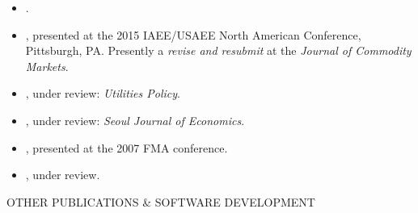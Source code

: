 \documentclass[9pt]{article}
\begin{document}
\begin{itemize}[noitemsep, nolistsep]
\item \href{https://papers.ssrn.com/sol3/papers.cfm?abstract_id=2848527}{\color{Blue}{High-Frequency Trading and Market Efficiency: Evidence from the Weekly Natural Gas Storage Report}}. 
\item \href{http://complete-markets.com/wp-content/uploads/2013/11/ng_vol.pdf}{\color{Blue}{The Components of Volatility in Natural Gas Futures}}, presented at the 2015 IAEE/USAEE North American Conference, Pittsburgh, PA.  Presently a {\it revise and resubmit} at the {\it Journal of Commodity Markets}.
\item \href{http://ssrn.com/abstract=2371753}{\color{Blue}{State Dependence in the Natural Gas and Rig Count Relationship}}, under review: {\it Utilities Policy}.
\item \href{http://complete-markets.com/wp-content/uploads/2014/07/Performance_measures_June_2014.pdf}{\color{Blue}{How Consistent are the Judges of Portfolio Performance?}}, under review: {\it Seoul Journal of Economics}.
\item \href{https://docs.google.com/file/d/0B46EsGCAlLnPdmxsT3ZtVGk5Wkk/edit?usp=sharing}{\color{Blue}{Almost Stochastic Dominance: A Penchant for Risk}}, presented at the 2007 FMA conference.
\item \href{https://docs.google.com/file/d/0B46EsGCAlLnPWTctYmtnUDM1QWs/edit?usp=sharing}{\color{Blue}{Causes of Asymmetric Volatility in Oil Futures}}, under review.
\end{itemize}
\vspace{10pt}
OTHER PUBLICATIONS \& SOFTWARE DEVELOPMENT
\end{document}
